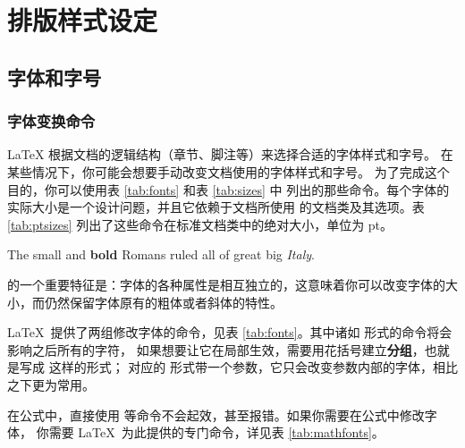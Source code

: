 \chapter{排版样式设定}

\section{字体和字号}

\subsection{字体变换命令}
\LaTeX{} 根据文档的逻辑结构（章节、脚注等）来选择合适的字体样式和字号。
在某些情况下，你可能会想要手动改变文档使用的字体样式和字号。
为了完成这个目的，你可以使用表 \ref{tab:fonts} 和表 \ref{tab:sizes} 中
列出的那些命令。每个字体的实际大小是一个设计问题，并且它依赖于文档所使用
的文档类及其选项。表 \ref{tab:ptsizes} 列出了这些命令在标准文档类中的绝对大小，单位为 pt。

\begin{example}
{\small The small and
\textbf{bold} Romans ruled}
{\Large all of great big
{\itshape Italy}.}
\end{example}

\LaTeXe 的一个重要特征是：字体的各种属性是相互独立的，这意味着你可以改变字体的大小，而仍然保留字体原有的粗体或者斜体的特性。

\LaTeX\ 提供了两组修改字体的命令，见表 \ref{tab:fonts}。其中诸如  形式的命令将会影响之后所有的字符，
如果想要让它在局部生效，需要用花括号建立\textbf{分组}，也就是写成  这样的形式；
对应的  形式带一个参数，它只会改变参数内部的字体，相比之下更为常用。

在公式中，直接使用  等命令不会起效，甚至报错。如果你需要在公式中修改字体，
你需要 \LaTeX\ 为此提供的专门命令，详见表 \ref{tab:mathfonts}。

